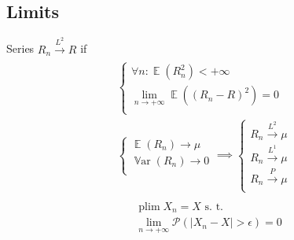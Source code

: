 \documentclass{article}
\def\Var#1{{\operatorname{\mathbb{V}ar} \left({#1}\right)}}
\def\Exp#1{{\operatorname{\mathbb{E}} \left({#1}\right)}}
\def\Eq#1{{\begin{gather}\begin{split} #1 \end{split}\end{gather}}}
\begin{document}
\begin{multicols}{2}
    \subsection*{Limits}
Series $R_n \xrightarrow{L^2} R$ if
\Eq{
\begin{cases}
\forall n : \Exp{R_n^2} < +\infty \\
\lim\limits_{n \to +\infty} \Exp{(R_n - R)^2} = 0 \\
\end{cases} \\
\begin{cases}
\Exp{R_n} \rightarrow \mu \\
\Var{R_n} \rightarrow 0 \\
\end{cases}
\implies
\begin{cases}
R_n \xrightarrow{L^2} \mu \\
R_n \xrightarrow{L^1} \mu \\
R_n \xrightarrow{P} \mu \\
\end{cases}
}
\Eq{
    &\operatorname{plim} X_n = X \text{ s. t. } \\
    &\lim\limits_{n \to +\infty} \mathcal{P}(|X_n - X| > \epsilon) = 0
}
\end{multicols}
\end{document}

